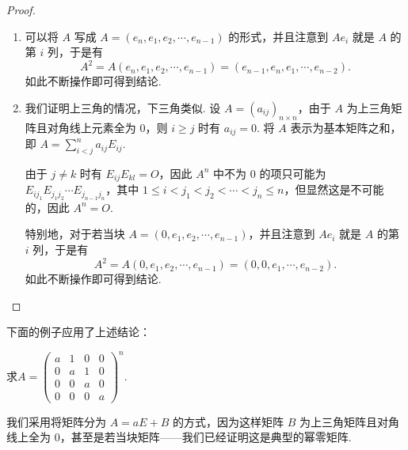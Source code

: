 \begin{enumerate}
          \begin{proof}
            \begin{enumerate}
                \item 可以将 $A$ 写成 $A = (e_n, e_1, e_2, \cdots, e_{n-1})$ 的形式，并且注意到 $Ae_i$ 就是 $A$ 的第 $i$ 列，于是有
                \[A^2 = A(e_n, e_1, e_2, \cdots, e_{n-1}) = (e_{n-1}, e_n, e_1, \cdots, e_{n-2}).\]
                如此不断操作即可得到结论.
                \item 我们证明上三角的情况，下三角类似. 设 $A = (a_{ij})_{n \times n}$，由于 $A$ 为上三角矩阵且对角线上元素全为 $0$，则 $i \geqslant j$ 时有 $a_{ij} = 0$. 将 $A$ 表示为基本矩阵之和，即 $A = \sum\limits_{i < j}^na_{ij}E_{ij}$.

                由于 $j \neq k$ 时有 $E_{ij}E_{kl} = O$，因此 $A^n$ 中不为 $0$ 的项只可能为 $E_{ij_1}E_{j_1j_2}\cdots E_{j_{n-1}j_n}$，其中 $1 \leqslant i < j_1 < j_2 < \cdots < j_n \leqslant n$，但显然这是不可能的，因此 $A^n = O$.

                特别地，对于若当块 $A = (0,e_1,e_2,\cdots,e_{n-1})$，并且注意到 $Ae_i$ 就是 $A$ 的第 $i$ 列，于是有
                \[A^2 = A(0,e_1,e_2,\cdots,e_{n-1}) = (0, 0, e_1, \cdots, e_{n-2}).\]
                如此不断操作即可得到结论.
            \end{enumerate}
          \end{proof}

          下面的例子应用了上述结论：
          \begin{example}{}{}
              求$A=\begin{pmatrix}a & 1 & 0 & 0 \\ 0 & a & 1 & 0 \\ 0 & 0 & a & 0 \\ 0 & 0 & 0 & a \end{pmatrix}^n$.
          \end{example}
          我们采用将矩阵分为 $A = aE + B$ 的方式，因为这样矩阵 $B$ 为上三角矩阵且对角线上全为 0，甚至是若当块矩阵——我们已经证明这是典型的幂零矩阵.


\end{enumerate}
